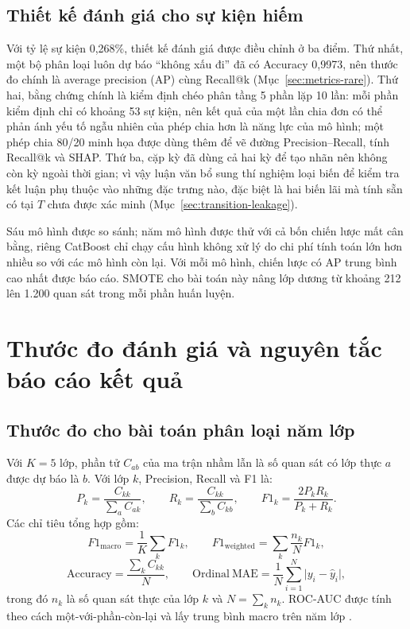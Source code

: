 \subsection{Thiết kế đánh giá cho sự kiện hiếm}
\label{sec:transition-rare-eval}

Với tỷ lệ sự kiện 0,268\%, thiết kế đánh giá được điều chỉnh ở ba điểm. Thứ nhất, một bộ phân loại luôn dự báo ``không xấu đi'' đã có Accuracy 0,9973, nên thước đo chính là average precision (AP) cùng Recall@k (Mục~\ref{sec:metrics-rare}). Thứ hai, bằng chứng chính là kiểm định chéo phân tầng 5 phần lặp 10 lần: mỗi phần kiểm định chỉ có khoảng 53 sự kiện, nên kết quả của một lần chia đơn có thể phản ánh yếu tố ngẫu nhiên của phép chia hơn là năng lực của mô hình; một phép chia 80/20 minh họa được dùng thêm để vẽ đường Precision--Recall, tính Recall@k và SHAP. Thứ ba, cặp kỳ đã dùng cả hai kỳ để tạo nhãn nên không còn kỳ ngoài thời gian; vì vậy luận văn bổ sung thí nghiệm loại biến để kiểm tra kết luận phụ thuộc vào những đặc trưng nào, đặc biệt là hai biến lãi mà tính sẵn có tại $T$ chưa được xác minh (Mục~\ref{sec:transition-leakage}).

Sáu mô hình được so sánh; năm mô hình được thử với cả bốn chiến lược mất cân bằng, riêng CatBoost chỉ chạy cấu hình không xử lý do chi phí tính toán lớn hơn nhiều so với các mô hình còn lại. Với mỗi mô hình, chiến lược có AP trung bình cao nhất được báo cáo. SMOTE cho bài toán này nâng lớp dương từ khoảng 212 lên 1.200 quan sát trong mỗi phần huấn luyện.

\section{Thước đo đánh giá và nguyên tắc báo cáo kết quả}
\label{sec:metrics}

\subsection{Thước đo cho bài toán phân loại năm lớp}

Với $K=5$ lớp, phần tử $C_{ab}$ của ma trận nhầm lẫn là số quan sát có lớp thực $a$ được dự báo là $b$. Với lớp $k$, Precision, Recall và F1 là:
\[
P_k=\frac{C_{kk}}{\sum_a C_{ak}},\qquad
R_k=\frac{C_{kk}}{\sum_b C_{kb}},\qquad
F1_k=\frac{2P_kR_k}{P_k+R_k}.
\]
Các chỉ tiêu tổng hợp gồm:
\[
F1_{\mathrm{macro}}=\frac{1}{K}\sum_{k}F1_k,\qquad
F1_{\mathrm{weighted}}=\sum_{k}\frac{n_k}{N}F1_k,
\]
\[
\mathrm{Accuracy}=\frac{\sum_k C_{kk}}{N},\qquad
\mathrm{Ordinal\ MAE}=\frac{1}{N}\sum_{i=1}^{N}\lvert y_i-\hat{y}_i\rvert,
\]
trong đó $n_k$ là số quan sát thực của lớp $k$ và $N=\sum_k n_k$. ROC-AUC được tính theo cách một-với-phần-còn-lại và lấy trung bình macro trên năm lớp \cite{fawcett2006roc}.

